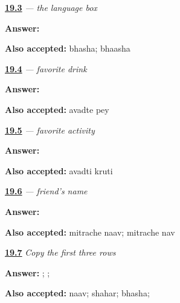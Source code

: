 \noindent\begin{minipage}[t]{\linewidth}
\raggedright
\hyperlink{review-MR-A1F01-bhasha-check}{\textbf{19.3}} \emph{ — the language box}\par
\small \textbf{Answer:} \par
\footnotesize \textbf{Also accepted:} bhasha; bhaasha
\end{minipage}\par\medskip

\noindent\begin{minipage}[t]{\linewidth}
\raggedright
\hyperlink{review-MR-A1F01-avdate-pey-check}{\textbf{19.4}} \emph{  — favorite drink}\par
\small \textbf{Answer:}  \par
\footnotesize \textbf{Also accepted:} avadte pey
\end{minipage}\par\medskip

\noindent\begin{minipage}[t]{\linewidth}
\raggedright
\hyperlink{review-MR-A1F01-avadti-kruti-check}{\textbf{19.5}} \emph{  — favorite activity}\par
\small \textbf{Answer:}  \par
\footnotesize \textbf{Also accepted:} avadti kruti
\end{minipage}\par\medskip

\noindent\begin{minipage}[t]{\linewidth}
\raggedright
\hyperlink{review-MR-A1F01-mitrache-naav-check}{\textbf{19.6}} \emph{  — friend's name}\par
\small \textbf{Answer:}  \par
\footnotesize \textbf{Also accepted:} mitrache naav; mitrache nav
\end{minipage}\par\medskip

\noindent\begin{minipage}[t]{\linewidth}
\raggedright
\hyperlink{review-MR-A1F02-first-three-copy-check}{\textbf{19.7}} \emph{Copy the first three rows}\par
\small \textbf{Answer:} ; ; \par
\footnotesize \textbf{Also accepted:} naav; shahar; bhasha;   
\end{minipage}\par\medskip

